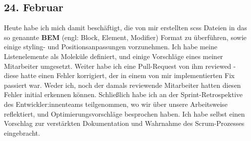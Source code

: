\subsection{24. Februar}
Heute habe ich mich damit beschäftigt, die von mir erstellten scss Dateien in das so genannte \textbf{BEM} (engl: Block, Element, Modifier) Format zu überführen, sowie einige styling- und Positionsanpassungen vorzunehmen. Ich habe meine Listenelemente als Moleküle definiert, und einige Vorschläge eines meiner Mitarbeiter umgesetzt. Weiter habe ich eine Pull-Request von ihm reviewed - diese hatte einen Fehler korrigiert, der in einem von mir implementierten Fix passiert war. Weder ich, noch der damals reviewende Mitarbeiter hatten diesen Fehler initial erkennen können. Schließlich habe ich an der Sprint-Retrospektive des Entwickler:innenteams teilgenommen, wo wir über unsere Arbeitsweise reflektiert, und Optimierungsvorschläge besprochen haben. Ich habe selbst einen Vorschlag zur verstärkten Dokumentation und Wahrnahme des Scrum-Prozesses eingebracht.